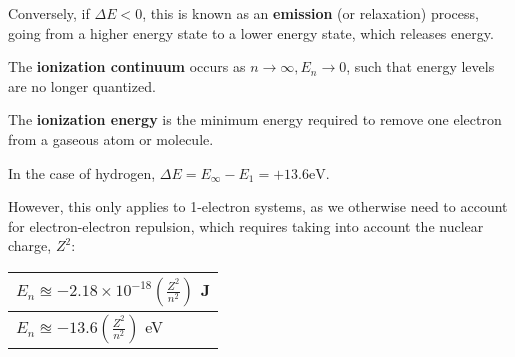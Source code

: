 Conversely, if $\Delta E < 0$, this is known as an \textbf{emission} (or relaxation) process,
going from a higher energy state to a lower energy state, which releases energy.

The \textbf{ionization continuum} occurs as $n \rightarrow \infty, E_n \rightarrow 0$,
such that energy levels are no longer quantized.

The \textbf{ionization energy} is the minimum energy required to remove one electron from
a gaseous atom or molecule.

In the case of hydrogen, $\Delta E = E_\infty - E_1 = + 13.6 \si{\electronvolt}$.

However, this only applies to 1-electron systems, as we otherwise need to account for
electron-electron repulsion, which requires taking into account the nuclear charge, $Z^2$:

\begin{tabularx}{\linewidth}{|Y|} \hline
    $E_n \approxeq -2.18 \times 10^{-18} \left( \frac{Z^2}{n^2} \right)$ \si{\joule} \\ \hline
    $E_n \approxeq -13.6 \left( \frac{Z^2}{n^2} \right)$ \si{\electronvolt} \\ \hline
\end{tabularx}